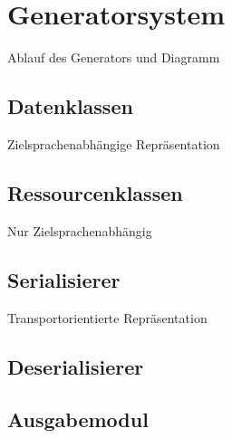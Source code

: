 \section{Generatorsystem}
\label{sec:generatorsystem}

Ablauf des Generators und Diagramm

\subsection{Datenklassen}
\label{sec:dataclasses}

Zielsprachenabhängige Repräsentation

\subsection{Ressourcenklassen}
\label{sec:ressourceclasses}

Nur Zielsprachenabhängig


\subsection{Serialisierer}
\label{sec:serialiser}

Transportorientierte Repräsentation

\subsection{Deserialisierer}
\label{sec:deserialiser}


\subsection{Ausgabemodul}
\label{sec:printer}
